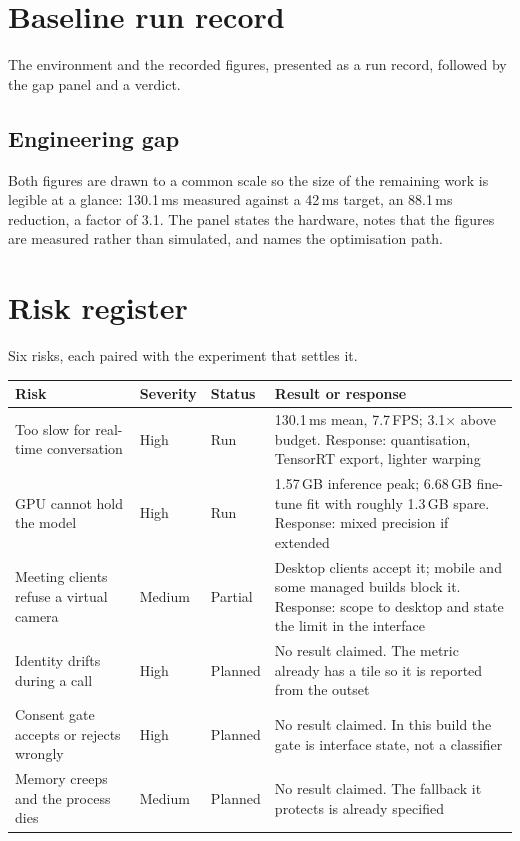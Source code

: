 \documentclass[11pt,a4paper]{report}
\begin{document}
\section{Baseline run record}

The environment and the recorded figures, presented as a run record, followed
by the gap panel and a verdict.

\subsection{Engineering gap}
\label{sec:gap}

Both figures are drawn to a common scale so the size of the remaining work is
legible at a glance: 130.1\,ms measured against a 42\,ms target, an 88.1\,ms
reduction, a factor of 3.1. The panel states the hardware, notes that the
figures are measured rather than simulated, and names the optimisation path.

\section{Risk register}

Six risks, each paired with the experiment that settles it.

\begin{longtable}{L{4.1cm} L{1.5cm} L{1.9cm} L{6.9cm}}
\toprule
\textbf{Risk} & \textbf{Severity} & \textbf{Status} & \textbf{Result or response} \\
\midrule
\endhead
Too slow for real-time conversation & High & Run &
  130.1\,ms mean, 7.7\,FPS; 3.1$\times$ above budget. Response: quantisation,
  TensorRT export, lighter warping \\
GPU cannot hold the model & High & Run &
  1.57\,GB inference peak; 6.68\,GB fine-tune fit with roughly 1.3\,GB spare.
  Response: mixed precision if extended \\
Meeting clients refuse a virtual camera & Medium & Partial &
  Desktop clients accept it; mobile and some managed builds block it.
  Response: scope to desktop and state the limit in the interface \\
Identity drifts during a call & High & Planned &
  No result claimed. The metric already has a tile so it is reported from the
  outset \\
Consent gate accepts or rejects wrongly & High & Planned &
  No result claimed. In this build the gate is interface state, not a
  classifier \\
Memory creeps and the process dies & Medium & Planned &
  No result claimed. The fallback it protects is already specified \\
\bottomrule
\end{longtable}
\end{document}
